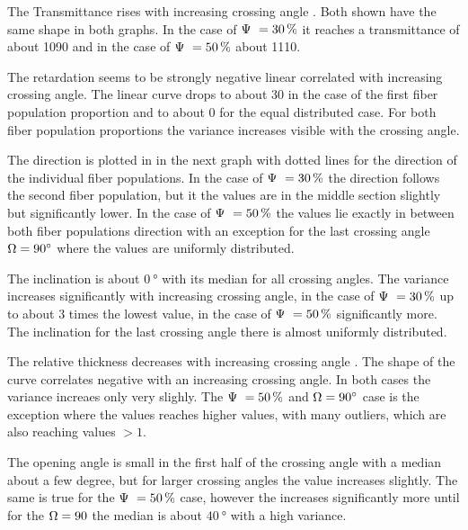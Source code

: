 \par
The Transmittance rises with increasing crossing angle \modelOmega{}. Both shown \modelPsi have the same shape in both graphs. In the case of $\modelPsi = \SI{30}{\percent}$ it reaches a transmittance of about \SI{1090}{} and in the case of $\modelPsi = \SI{50}{\percent}$ about \SI{1110}{}.
\par
The retardation seems to be strongly negative linear correlated with increasing crossing angle.
The linear curve drops to about \SI{30}{} in the case of the first fiber population proportion and to about \SI{0}{} for the equal distributed case.
For both fiber population proportions the variance increases visible with the crossing angle.
\par
The direction is plotted in in the next graph with dotted lines for the direction of the individual fiber populations.
In the case of $\modelPsi = \SI{30}{\percent}$ the direction follows the second fiber population, but it the values are in the middle section slightly but significantly lower.
In the case of $\modelPsi = \SI{50}{\percent}$ the values lie exactly in between both fiber populations direction with an exception for the last crossing angle $\textnormal{$\Omega$} = \SI{90}{\degree}$ where the values are uniformly distributed.
\par
The inclination is about $\SI{0}{\degree}$ with its median for all crossing angles.
The variance increases significantly with increasing crossing angle, in the case of $\modelPsi = \SI{30}{\percent}$ up to about 3 times the lowest value, in the case of $\modelPsi = \SI{50}{\percent}$ significantly more.
The inclination for the last crossing angle there is almost uniformly distributed.
\par
The relative thickness \trel{} decreases with increasing crossing angle \modelOmega{}.
The shape of the curve correlates negative with an increasing crossing angle.
In both cases the variance increaes only very slighly.
The $\modelPsi = \SI{50}{\percent}$ and $\textnormal{$\Omega$} = \SI{90}{\degree}$ case is the exception where the \trel{} values reaches higher values, with many outliers, which are also reaching values $>1$.
\par
The opening angle \openingAngle{} is small in the first half of the crossing angle with a median about a few degree, but for larger crossing angles the value increases slightly.
The same is true for the $\modelPsi = \SI{50}{\percent}$ case, however the \openingAngle{} increases significantly more until for the $\textnormal{$\Omega$} = \SI{90}{}$ the median is about $\SI{40}{\degree}$ with a high variance.
%
% 
%
